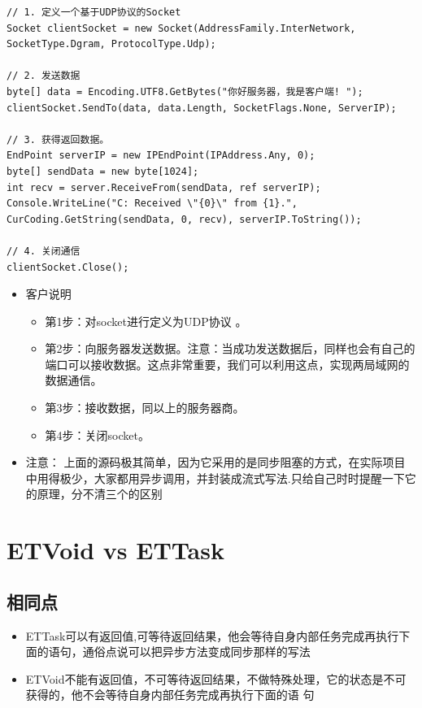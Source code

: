 \documentclass[9pt, b5paper]{article}
\begin{document}
\begin{verbatim}
// 1. 定义一个基于UDP协议的Socket
Socket clientSocket = new Socket(AddressFamily.InterNetwork, SocketType.Dgram, ProtocolType.Udp);

// 2. 发送数据
byte[] data = Encoding.UTF8.GetBytes("你好服务器，我是客户端! ");
clientSocket.SendTo(data, data.Length, SocketFlags.None, ServerIP);

// 3. 获得返回数据。
EndPoint serverIP = new IPEndPoint(IPAddress.Any, 0);
byte[] sendData = new byte[1024];
int recv = server.ReceiveFrom(sendData, ref serverIP);
Console.WriteLine("C: Received \"{0}\" from {1}.", CurCoding.GetString(sendData, 0, recv), serverIP.ToString());

// 4. 关闭通信
clientSocket.Close();
\end{verbatim}
\begin{itemize}
\item 客户说明
\begin{itemize}
\item 第1步：对socket进行定义为UDP协议 。
\item 第2步：向服务器发送数据。注意：当成功发送数据后，同样也会有自己的端口可以接收数据。这点非常重要，我们可以利用这点，实现两局域网的数据通信。
\item 第3步：接收数据，同以上的服务器商。
\item 第4步：关闭socket。
\end{itemize}
\item 注意： 上面的源码极其简单，因为它采用的是同步阻塞的方式，在实际项目中用得极少，大家都用异步调用，并封装成流式写法.只给自己时时提醒一下它的原理，分不清三个的区别
\end{itemize}
\section{ETVoid vs ETTask}
\label{sec-5}
\subsection{相同点}
\label{sec-5-1}
\begin{itemize}
\item ETTask可以有返回值,可等待返回结果，他会等待自身内部任务完成再执行下面的语句，通俗点说可以把异步方法变成同步那样的写法
\item ETVoid不能有返回值，不可等待返回结果，不做特殊处理，它的状态是不可获得的，他不会等待自身内部任务完成再执行下面的语 句
\end{itemize}
\end{document}
